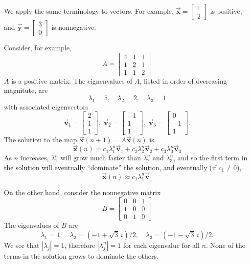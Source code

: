 \documentclass[reqno]{immbook}
\newcommand{\BV}{\vec{\textbf{v}}}
\newcommand{\BX}{\vec{\textbf{x}}}
\newcommand{\BY}{\vec{\textbf{y}}}
\numberwithin{equation}{chapter}
\numberwithin{question}{section}
\numberwithin{theorem}{chapter}
\numberwithin{figure}{chapter}
\theoremstyle{definition}
\begin{document}
We apply the same terminology to vectors. For example,
$\BX = \begin{bmatrix} 1 \\ 2\end{bmatrix}$ is positive, and
$\BY = \begin{bmatrix} 3 \\ 0\end{bmatrix}$ is nonnegative.

Consider, for example,
\begin{equation}
   A = \begin{bmatrix}
             4 & 1 & 1 \\ 1 & 2 & 1 \\ 1 & 1 & 2
       \end{bmatrix}
\end{equation}
$A$ is a positive matrix.
The eignenvalues of $A$, listed in order of decreasing magnitute,
are
\begin{equation}
   \lambda_1 = 5, \quad
   \lambda_2 = 2, \quad
   \lambda_3 = 1
\end{equation}
with associated eigenvectors
\begin{equation}
   \BV_1 = \begin{bmatrix} 2 \\ 1 \\ 1 \end{bmatrix}, \;
   \BV_2 = \begin{bmatrix} -1 \\ 1 \\ 1 \end{bmatrix}, \;
   \BV_3 = \begin{bmatrix} 0 \\ -1 \\ 1 \end{bmatrix}.
\end{equation}
The solution to the map $\BX(n+1) = A\BX(n)$ is
\begin{equation}
   \BX(n) = c_1 \lambda_1^n \BV_1 + c_2 \lambda_2^n\BV_2 + c_3 \lambda_3^n\BV_3
\end{equation}
As $n$ increases, $\lambda_1^n$ will grow much faster than
$\lambda_2^n$ and $\lambda_3^n$, and so the first term in the
solution will eventually ``dominate'' the solution,
and eventually (if $c_1\ne 0$),
\begin{equation}
   \BX(n) \approx c_1 \lambda_1^n \BV_1
\end{equation}

On the other hand, consider the nonnegative matrix
\begin{equation}
   B = \begin{bmatrix}
             0 & 0 & 1 \\ 1 & 0 & 0 \\ 0 & 1 & 0
       \end{bmatrix}
\end{equation}
The eigenvalues of $B$ are
\begin{equation}
  \lambda_1 = 1, \quad
  \lambda_2 =  (-1+\sqrt{3}\,i)/2, \quad
  \lambda_3 =  (-1-\sqrt{3}\,i)/2.
\end{equation}
We see that $|\lambda_j| = 1$,
therefore $|\lambda_j^n| = 1$ for each eigenvalue for all $n$.
None of the terms in the solution grows to dominate the others.
\end{document}
